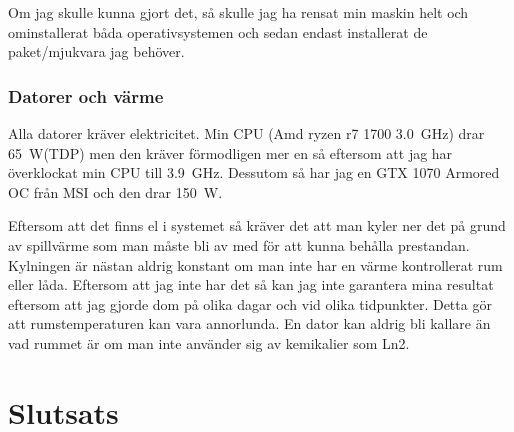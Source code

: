 \documentclass[12pt, a4paper]{report}
\begin{document}
Om jag skulle kunna gjort det, så skulle jag ha rensat min maskin helt och ominstallerat båda operativsystemen och sedan endast installerat de paket/mjukvara jag behöver.

\subsubsection{Datorer och värme}

Alla datorer kräver elektricitet. Min CPU (Amd ryzen r7 1700 \SI{3.0}{\giga\hertz}) drar \SI{65}{\watt}(TDP)\cite{ryzen1700spec} men den kräver förmodligen mer en så eftersom att jag har överklockat min CPU till \SI{3.9}{\giga\hertz}.
Dessutom så har jag en GTX 1070 Armored OC från MSI\cite{1070} och den drar \SI{150}{\watt}.

Eftersom att det finns el i systemet så kräver det att man kyler ner det på grund av spillvärme\cite{wasteheat} som man måste bli av med för att kunna behålla prestandan. Kylningen är nästan aldrig konstant om man inte har en värme kontrollerat rum eller låda. Eftersom att jag inte har det så kan jag inte garantera mina resultat eftersom att jag gjorde dom på olika dagar och vid olika tidpunkter. Detta gör att rumstemperaturen kan vara annorlunda. En dator kan aldrig bli kallare än vad rummet är\cite{thermodynamics} om man inte använder sig av kemikalier som Ln2.



\section{Slutsats}\label{slutsats}



\printbibliography
\end{document}
